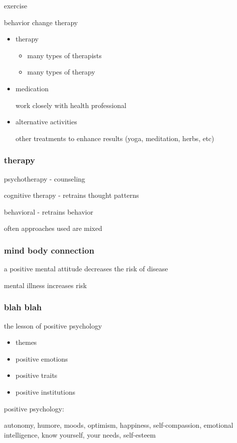 \documentclass[letterpaper]{article}
\begin{document}
exercise

behavior change therapy

\begin{itemize}
\item
therapy
\begin{itemize}
\item
many types of therapists
\item
many types of therapy
\end{itemize}
\item
medication

work closely with health professional
\item
alternative activities

other treatments to enhance results (yoga, meditation, herbs, etc)
\end{itemize}

\subsubsection*{therapy}
psychotherapy - counseling

cognitive therapy - retrains thought patterns

behavioral - retrains behavior

often approaches used are mixed

\subsubsection*{mind body connection}
a positive mental attitude decreases the risk of disease

mental illness increases risk

\subsubsection*{blah blah}
the lesson of positive psychology
\begin{itemize}
\item
themes
\item
positive emotions
\item
positive traits
\item
positive institutions
\end{itemize}

positive psychology:

autonomy, humore, moods, optimism, happiness, self-compassion, emotional intelligence, know yourself, your needs, self-esteem
\end{document}
